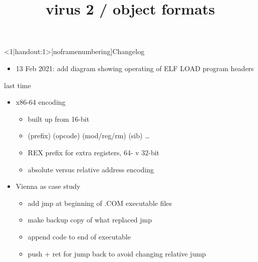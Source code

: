 \graphicspath{{./figures/}}
\title{virus 2 / object formats}
\date{}
\usepackage{contour}

\begin{frame}
    \titlepage
\end{frame}

{
\begin{frame}<1|handout:1>[noframenumbering]{Changelog}
    \begin{itemize}
    \item 13 Feb 2021: add diagram showing operating of ELF LOAD program headers
    \end{itemize}
\end{frame}
}





\begin{frame}{last time}
    \begin{itemize}
    \item x86-64 encoding
        \begin{itemize}
        \item built up from 16-bit
        \item (prefix) (opcode) (mod/reg/rm) (sib) \ldots
        \item REX prefix for extra registers, 64- v 32-bit
        \item absolute versus relative address encoding
        \end{itemize}
    \item Vienna as case study
        \begin{itemize}
        \item add jmp at beginning of .COM executable files
        \item make backup copy of what replaced jmp
        \item append code to end of executable
        \item push + ret for jump back to avoid changing relative jump
        \end{itemize}
    \end{itemize}
\end{frame}



